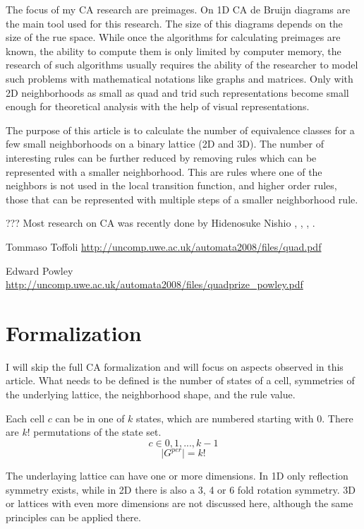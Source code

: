 \documentclass{ijuc}
\begin{document}
The focus of my CA research are preimages. On 1D CA de Bruijn diagrams are the main tool
used for this research. The size of this diagrams depends on the size of the rue space.
While once the algorithms for calculating preimages are known, the ability to compute
them is only limited by computer memory, the research of such algorithms usually requires
the ability of the researcher to model such problems with mathematical notations like
graphs and matrices. Only with 2D neighborhoods as small as quad and trid such representations
become small enough for theoretical analysis with the help of visual representations.

The purpose of this article is to calculate the number of equivalence classes for a few small
neighborhoods on a binary lattice (2D and 3D). The number of interesting rules can be further
reduced by removing rules which can be represented with a smaller neighborhood. This are rules
where one of the neighbors is not used in the local transition function, and higher order rules,
those that can be represented with multiple steps of a smaller neighborhood rule.

??? Most research on CA was recently done by Hidenosuke Nishio \cite{DBLP:journals/jca/Nishio12},
\cite{DBLP:journals/fuin/Nishio10}, \cite{DBLP:conf/ncma/Nishio09}, \cite{DBLP:conf/automata/NishioW08}.

Tommaso Toffoli
\url{http://uncomp.uwe.ac.uk/automata2008/files/quad.pdf}

Edward Powley
\url{http://uncomp.uwe.ac.uk/automata2008/files/quadprize_powley.pdf}

\section{Formalization}

I will skip the full CA formalization and will focus on aspects observed in this article.
What needs to be defined is the number of states of a cell, symmetries of the underlying lattice,
the neighborhood shape, and the rule value.

Each cell \(c\) can be in one of \(k\) states, which are numbered starting with 0.
There are \(k!\) permutations of the state set.
\[ c \in {0, 1, ..., k-1} \]
\[ \vert G^{per} \vert = k! \]

The underlaying lattice can have one or more dimensions. In 1D only reflection symmetry exists,
while in 2D there is also a 3, 4 or 6 fold rotation symmetry. 3D or lattices with even more
dimensions are not discussed here, although the same principles can be applied there.
\end{document}
